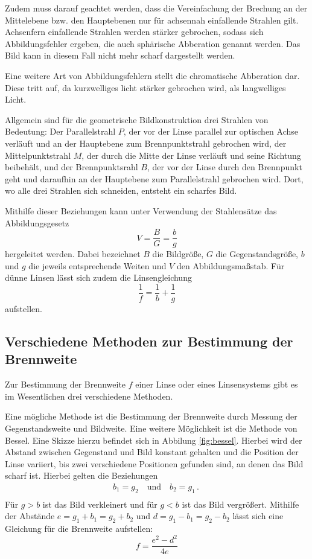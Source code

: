 Zudem muss darauf geachtet werden, dass die Vereinfachung der Brechung an der
Mittelebene bzw. den Hauptebenen nur für achsennah einfallende Strahlen gilt. Achsenfern
einfallende Strahlen werden stärker gebrochen, sodass sich Abbildungsfehler ergeben,
die auch sphärische Abberation genannt werden. Das Bild kann in diesem Fall nicht mehr scharf
dargestellt werden.

Eine weitere Art von Abbildungsfehlern stellt die chromatische Abberation dar. Diese
tritt auf, da kurzwelliges licht stärker gebrochen wird, als langwelliges Licht.

Allgemein sind für die geometrische Bildkonstruktion drei Strahlen von Bedeutung:
Der Parallelstrahl $P$, der vor der Linse parallel zur optischen Achse verläuft und an
der Hauptebene zum Brennpunktstrahl gebrochen wird, der Mittelpunktstrahl $M$, der
durch die Mitte der Linse verläuft und seine Richtung beibehält, und der Brennpunktsrahl
$B$, der vor der Linse durch den Brennpunkt geht und daraufhin an der Hauptebene zum Parallelstrahl
gebrochen wird. Dort, wo alle drei Strahlen sich schneiden, entsteht ein scharfes Bild.

Mithilfe dieser Beziehungen kann unter Verwendung der Stahlensätze das Abbildungsgesetz
\begin{equation}
  V=\frac{B}{G}=\frac{b}{g}
  \label{eqn:V}
\end{equation}
hergeleitet werden. Dabei bezeichnet $B$ die Bildgröße, $G$ die Gegenstandsgröße,
$b$ und $g$ die jeweils entsprechende Weiten und $V$ den Abbildungsmaßstab.
Für dünne Linsen lässt sich zudem die Linsengleichung
\begin{equation}
  \frac{1}{f}=\frac{1}{b}+\frac{1}{g}
\end{equation}
aufstellen.


\subsection{Verschiedene Methoden zur Bestimmung der Brennweite}
\label{subsec:Methoden}

Zur Bestimmung der Brennweite $f$ einer Linse oder eines Linsensystems gibt es im
Wesentlichen drei verschiedene Methoden.

Eine mögliche Methode ist die Bestimmung der Brennweite durch Messung der Gegenstandsweite
und Bildweite.
Eine weitere Möglichkeit ist die Methode von Bessel. Eine Skizze hierzu befindet sich in
Abbilung \ref{fig:bessel}. Hierbei wird der Abstand zwischen
Gegenstand und Bild konstant gehalten und die Position der Linse variiert, bis zwei
verschiedene Positionen gefunden sind, an denen das Bild scharf ist. Hierbei gelten die
Beziehungen
\begin{align*}
  b_1=g_2 \quad \text{und} \quad b_2=g_1\,.\ \\
\end{align*}
Für $g>b$ ist das Bild verkleinert und für $g<b$ ist das Bild vergrößert. Mithilfe der
Abstände $e=g_1+b_1=g_2+b_2$ und $d=g_1-b_1=g_2-b_2$ lässt sich eine Gleichung für die
Brennweite aufstellen:
\begin{equation}
  f=\frac{e^2-d^2}{4e}
  \label{eqn:bessel}
\end{equation}

